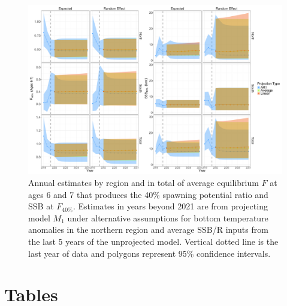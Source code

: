 \documentclass[
]{article}
\begin{document}
\begin{landscape}

\begin{figure}

{\centering \includegraphics[height=0.95\textheight]{proj_brps} 

}

\caption{Annual estimates by region and in total of average equilibrium $F$ at ages 6 and 7 that produces the 40\% spawning potential ratio and SSB at $F_{40\%}$. Estimates in years beyond 2021 are from projecting model $M_1$ under alternative assumptions for bottom temperature anomalies in the northern region and average SSB/R inputs from the last 5 years of the unprojected model. Vertical dotted line is the last year of data and polygons represent 95\% confidence intervals.}\label{fig:brps-proj}
\end{figure}

\end{landscape}

\clearpage

\setcounter{table}{0}
\renewcommand\thetable{\arabic{table}}

\hypertarget{tables}{%
\section*{Tables}\label{tables}}
\end{document}
